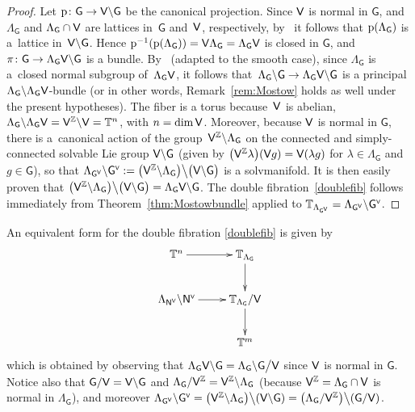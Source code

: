 \documentclass[pdftex]{sigma}
\numberwithin{equation}{section}
\newcommand{\Z}{\zed}
\def\V{{\sf V}}
\newcommand{\sfG}{\mathsf{G}}
\newcommand{\sfN}{\mathsf{N}}
\newcommand{\zed}{{\mathbb Z}} %
\newcommand{\torus}{{\mathbb T}} %
\begin{document}
\begin{proof}
 Let ${\rm p}\colon \sfG\to \V\backslash\sfG$ be the canonical
 projection. Since $\V$ is normal in $\sfG$, and $\Lambda_\sfG$ and
 $\Lambda_\sfG \cap \V$ are lattices in~$\sfG$ and~$\V$, respectively,
 by~\cite[Lemma~5.1.4(a)]{Corwin1990} it follows that
$ {\rm p} (\Lambda_\sfG)$ is a~lattice in~$\V\backslash\sfG$. Hence
${\rm p}^{-1}({\rm p} (\Lambda_\sfG))=\V \Lambda_\sfG=\Lambda_\sfG \V$
is closed in $\sfG$, and $\pi\colon \sfG\to
\Lambda_\sfG \V\backslash\sfG$ is a bundle. By~\cite[Section~7.4]{Steenrod} (adapted to the smooth case), since
$\Lambda_\sfG$ is a~closed normal subgroup of~$\Lambda_\sfG \V$, it
follows that~$\Lambda_\sfG\backslash\sfG\to
\Lambda_\sfG \V\backslash\sfG$ is a
principal $\Lambda_\sfG\backslash\Lambda_\sfG \V$-bundle (or in
other words, Remark~\ref{rem:Mostow} holds as well under the present hypotheses).
The fiber is a torus because~$\V$ is abelian,
$\Lambda_\sfG\backslash\Lambda_\sfG \V=\V^\zed\backslash\V=\torus^n$,
with $n=\dim\V$. Moreover, because $\V$ is normal in $\sfG$, there
is a~canonical action of the group~$\V^\Z\backslash\Lambda_{\sfG}$ on
the connected and simply-connected solvable Lie group
$\V\backslash\sfG$ (given by $\big(\V^\zed \lambda\big) (\V
g)=\V (\lambda g)$ for $\lambda\in\Lambda_\sfG$ and $g\in\sfG$), so that
$\Lambda_{\sfG^{\text{\tiny$\V$}}} \backslash
\sfG^{\text{\tiny$\V$}}:=\big(\V^\Z\backslash\Lambda_{\sfG}\big)
 \big\backslash \big(\V\backslash\sfG\big)$ is a solvmanifold. It
is then easily proven that $\big(\V^\Z\backslash\Lambda_{\sfG}\big)
 \big\backslash \big(\V\backslash\sfG\big)=\Lambda_\sfG\V\backslash
\sfG$.
The double fibration~\eqref{doublefib} follows immediately from
Theorem~\ref{thm:Mostowbundle} applied to
$\torus_{\Lambda_{\sfG^{\text{\tiny$\V$}}}}= \Lambda_{\sfG^{\text{\tiny$\V$}}} \backslash
\sfG^{\text{\tiny$\V$}}$.
\end{proof}

\begin{Remark}An equivalent form for the double fibration \eqref{doublefib} is given by
\begin{equation*}%
\xymatrix{
\torus^n \ar[r] &
\torus_{\Lambda_\sfG} \ar[d] \\
\Lambda_{\sfN^{\text{\tiny$\V$}}
}\backslash\sfN^{\text{\tiny$\V$}} \ar[r] & \torus_{\Lambda_\sfG} /\V \ar[d] \\
& \torus^m
}
\end{equation*}
which is obtained by observing that $\Lambda_\sfG\V\backslash
\sfG=\Lambda_\sfG\backslash \sfG\big{/}\V$ since $\V$
is normal in $\sfG$. Notice also that
$\sfG/\V=\V\backslash\sfG$ and $\Lambda_\sfG/\V^\zed=\V^\zed\backslash
\Lambda_\sfG$ (because $\V^\zed=\Lambda_\sfG\cap \V$ is normal in
$\Lambda_\sfG$), and moreover
$
\Lambda_{\sfG^{\text{\tiny$\V$}}} \backslash
\sfG^{\text{\tiny$\V$}}=\big(\V^\Z\backslash\Lambda_{\sfG}\big)
\big\backslash (\V\backslash\sfG)=
\big(\Lambda_{\sfG}/\V^\zed\big)
\big\backslash (\sfG/\V)$.
\end{Remark}
\end{document}
